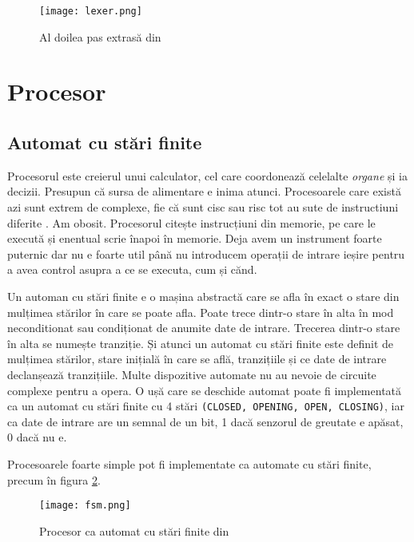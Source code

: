 \documentclass[../main.tex]{subfiles}
\begin{document}
\begin{figure}[h]
    \centering
    \texttt{[image: lexer.png]}
    \caption{Al doilea pas extrasă din \cite{lexer}}
    \label{fig:lexer}
\end{figure}

\section{Procesor}
\subsection{Automat cu stări finite}
Procesorul este creierul unui calculator, cel care coordonează celelalte \emph{organe} și ia decizii. Presupun că sursa
de alimentare e inima atunci. Procesoarele care există azi sunt extrem de complexe, fie că sunt \acrfull{cisc} sau
\acrfull{risc} tot au sute de instructiuni diferite \cite{intel64}. Am obosit. Procesorul citește instrucțiuni din memorie,
pe care le execută și enentual scrie înapoi în memorie. Deja avem un instrument foarte puternic dar nu e foarte util
până nu introducem operații de intrare ieșire pentru a avea control asupra a ce se executa, cum și cănd.

Un automan cu stări finite e o mașina abstractă care se afla în exact o stare din mulțimea stărilor în care se poate afla.
Poate trece dintr-o stare în alta în mod neconditionat sau condiționat de anumite date de intrare. Trecerea dintr-o stare
în alta se numește tranziție. Și atunci un automat cu stări finite este definit de mulțimea stărilor, stare inițială în care
se află, tranzițiile și ce date de intrare declanșează tranzițiile. Multe dispozitive automate nu au nevoie de circuite
complexe pentru a opera. O ușă care se deschide automat poate fi implementată ca un automat cu stări finite cu 4 stări
\texttt{(CLOSED, OPENING, OPEN, CLOSING)}, iar ca date de intrare are un semnal de un bit, 1 dacă senzorul de greutate
e apăsat, 0 dacă nu e.

Procesoarele foarte simple pot fi implementate ca automate cu stări finite, precum în figura \ref{fig:fsm}.

\begin{figure}[h]
    \centering
    \texttt{[image: fsm.png]}
    \caption{Procesor ca automat cu stări finite din \cite{fsm}}
    \label{fig:fsm}
\end{figure}
\end{document}
